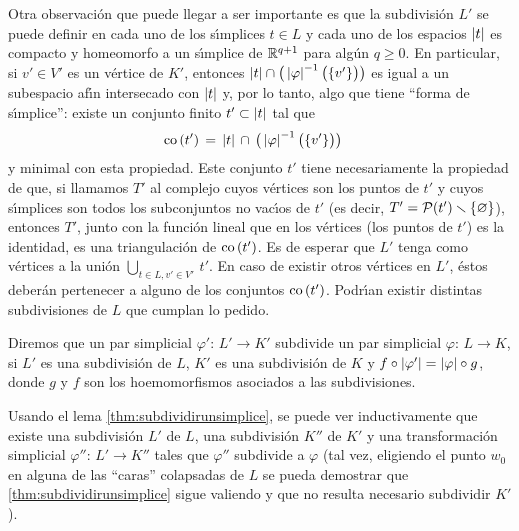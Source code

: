 \begin{obsSubdividirUnParSimplicial}
	Otra observaci\'{o}n que puede llegar a ser importante es que la
	subdivisi\'{o}n $L'$ se puede definir en cada uno de los
	s\'{\i}mplices $t\in L$ y cada uno de los espacios $\left|t\right|$ es
	compacto y homeomorfo a un s\'{\i}mplice de $\mathbb{R}^{q+1}$ para
	alg\'{u}n $q\geq 0$. En particular, si $v'\in V'$ es un v\'{e}rtice
	de $K'$, entonces
	\begin{math}
		\left|t\right|\cap\big(\left|\varphi\right|^{-1}\big(\{v'\}\big)\big)
	\end{math}
	es igual a un subespacio af\'{\i}n intersecado con $\left|t\right|$ y,
	por lo tanto, algo que tiene ``forma de s\'{\i}mplice'': existe un
	conjunto finito $t'\subset\left|t\right|$ tal que
	\begin{align*}
		\mathrm{co}\left(t'\right) & \,=\,\left|t\right|\,\cap\,
			\big(\left|\varphi\right|^{-1}\big(\{v'\}\big)\big)
	\end{align*}
	y minimal con esta propiedad. Este conjunto $t'$ tiene necesariamente
	la propiedad de que, si llamamos $T'$ al complejo cuyos v\'{e}rtices
	son los puntos de $t'$ y cuyos s\'{\i}mplices son todos los
	subconjuntos no vac\'{\i}os de $t'$
	(es decir, $T'=\mathcal{P}(t')\smallsetminus\{\varnothing\}$), entonces $T'$,
	junto con la funci\'{o}n lineal que en los v\'{e}rtices (los puntos
	de $t'$) es la identidad, es una triangulaci\'{o}n de $\mathrm{co}\left(t'\right)$.
	Es de esperar que $L'$ tenga como v\'{e}rtices a la uni\'{o}n
	$\bigcup_{t\in L,v'\in V'}\,t'$. En caso de existir otros v\'{e}rtices
	en $L'$, \'{e}stos deber\'{a}n pertenecer a alguno de los conjuntos
	$\mathrm{co}\left(t'\right)$. Podr\'{\i}an existir distintas subdivisiones de $L$
	que cumplan lo pedido.

	Diremos que un par simplicial $\varphi':\,L'\rightarrow K'$
	subdivide un par simplicial $\varphi:\,L\rightarrow K$, si
	$L'$ es una subdivisi\'{o}n de $L$, $K'$ es una subdivisi\'{o}n de $K$
	y $f\circ\left|\varphi'\right|=\left|\varphi\right|\circ g$, donde $g$ y $f$
	son los hoemomorfismos asociados a las subdivisiones.

	Usando el lema \ref{thm:subdividirunsimplice}, se puede ver
	inductivamente que existe una subdivisi\'{o}n $L'$ de $L$, una
	subdivisi\'{o}n $K''$ de $K'$ y una transformaci\'{o}n simplicial
	$\varphi'':\,L'\rightarrow K''$ tales que $\varphi''$ subdivide a
	$\varphi$ (tal vez, eligiendo el punto $w_{0}$ en alguna de las
	``caras'' colapsadas de $L$ se pueda demostrar que
	\ref{thm:subdividirunsimplice} sigue valiendo y que no resulta
	necesario subdividir $K'$).
\end{obsSubdividirUnParSimplicial}

